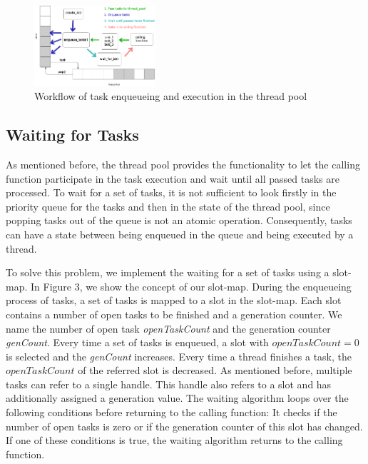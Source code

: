 \documentclass[conference]{IEEEtran}
\begin{document}
\begin{figure}
	\centering\includegraphics[width=0.4\textwidth]{img/pool_queue.png}
	\caption{Workflow of task enqueueing and execution in the thread pool}
	\label{fig1}
\end{figure}

\subsection{Waiting for Tasks}
As mentioned before, the thread pool provides the functionality to let the calling function participate in the task execution and wait until all passed tasks are processed. To wait for a set of tasks, it is not sufficient to look firstly in the priority queue for the tasks and then in the state of the thread pool, since popping tasks out of the queue is not an atomic operation. Consequently, tasks can have a state between being enqueued in the queue and being executed by a thread.

To solve this problem, we implement the waiting for a set of tasks using a slot-map. In Figure 3, we show the concept of our slot-map. During the enqueueing process of tasks, a set of tasks is mapped to a slot in the slot-map. Each slot contains a number of open tasks to be finished and a generation counter. We name the number of open task \emph{openTaskCount} and the generation counter \emph{genCount}. Every time a set of tasks is enqueued, a slot with $openTaskCount = 0$ is selected and the \emph{genCount} increases. Every time a thread finishes a task, the $openTaskCount$ of the referred slot is decreased. As mentioned before, multiple tasks can refer to a single handle. This handle also refers to a slot and has additionally assigned a generation value. The waiting algorithm loops over the following conditions before returning to the calling function: It checks if the number of open tasks is zero or if the generation counter of this slot has changed. If one of these conditions is true, the waiting algorithm returns to the calling function.
\end{document}
